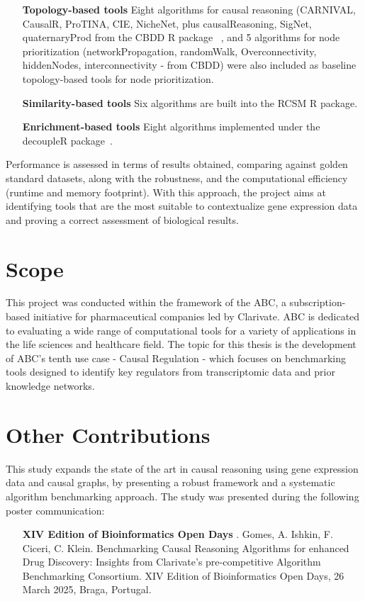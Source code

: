 \begin{enumerate}
\item[\textbf{Topology-based tools}] Eight algorithms for causal reasoning (\gls{CARNIVAL}, CausalR, ProTINA, \gls{CIE}, NicheNet, plus causalReasoning, SigNet, quaternaryProd from the \gls{CBDD} \gls{R} package~\cite{RN36} , and 5 algorithms for node prioritization (networkPropagation, randomWalk, Overconnectivity, hiddenNodes, interconnectivity - from \gls{CBDD}) were also included as baseline topology-based tools for node prioritization. 
\item[\textbf{Similarity-based tools }] Six algorithms are built into the \gls{RCSM} R package.
\item[\textbf{Enrichment-based tools}] Eight algorithms implemented under the decoupleR package~\cite{RN35}.
\end{enumerate}

Performance is assessed in terms of results obtained, comparing against golden standard datasets, along with the robustness, and the computational efficiency (runtime and memory footprint). 
With this approach, the project aims at identifying tools that are the most suitable to contextualize gene expression data and proving a correct assessment of biological results.

\section{Scope} %
\label{sec:scope}
This project was conducted within the framework of the \gls{ABC}, a subscription-based initiative for pharmaceutical companies led by Clarivate. \gls{ABC} is dedicated to evaluating a wide range of computational tools for a variety of applications in the life sciences and healthcare field. The topic for this thesis is the development of \gls{ABC}'s tenth use case - Causal Regulation - which focuses on benchmarking tools designed to identify key regulators from transcriptomic data and prior knowledge networks.

\section{Other Contributions} %
\label{sec:other_contributions}

This study expands the state of the art in causal reasoning using gene expression data and causal graphs, by presenting a robust framework and a systematic algorithm benchmarking approach. The study was presented during the following poster communication:
\begin{enumerate}
\item[\textbf{XIV Edition of Bioinformatics Open Days}] . Gomes, A. Ishkin, F. Ciceri, C. Klein. Benchmarking Causal Reasoning Algorithms for enhanced Drug Discovery: Insights from Clarivate's pre-competitive Algorithm Benchmarking Consortium. XIV Edition of Bioinformatics Open Days, 26 March 2025, Braga, Portugal.
\end{enumerate}

